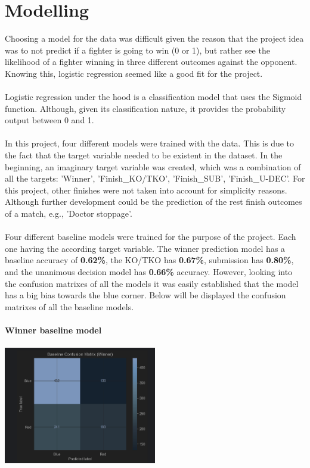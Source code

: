 \documentclass{article}
\begin{document}
\section{Modelling}
Choosing a model for the data was difficult given the reason that the project idea was to not predict if a fighter is going to win (0 or 1), but rather see the likelihood of a fighter winning in three different outcomes against the opponent. Knowing this, logistic regression seemed like a good fit for the project.\\\\
Logistic regression under the hood is a classification model that uses the Sigmoid function. Although, given its classification nature, it provides the probability output between 0 and 1.\\\\
In this project, four different models were trained with the data. This is due to the fact that the target variable needed to be existent in the dataset. In the beginning, an imaginary target variable was created, which was a combination of all the targets: 'Winner', 'Finish\_KO/TKO', 'Finish\_SUB', 'Finish\_U-DEC'. For this project, other finishes were not taken into account for simplicity reasons. Although further development could be the prediction of the rest finish outcomes of a match, e.g., 'Doctor stoppage'.\\\\
Four different baseline models were trained for the purpose of the project. Each one having the according target variable. The winner prediction model has a baseline accuracy of \textbf{0.62\%}, the KO/TKO has \textbf{0.67\%}, submission has \textbf{0.80\%}, and the unanimous decision model has \textbf{0.66\%} accuracy. However, looking into the confusion matrixes of all the models it was easily established that the model has a big bias towards the blue corner.
Below will be displayed the confusion matrixes of all the baseline models.\\\\
	{\large \textbf{Winner baseline model}}\\\\
	\includegraphics[width=0.5\textwidth]{images/CM_Winner.png}\\\\
	
\end{document}
